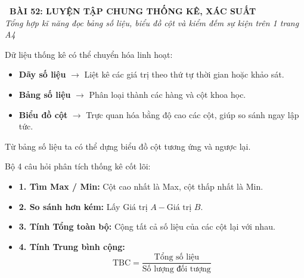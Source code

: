 \documentclass[14pt,a4paper,oneside]{extbook}
\begin{document}
\noindent
\begin{tcolorbox}[
  enhanced,
  colback=teal!8!white,
  colframe=teal!80!black,
  arc=3mm, boxrule=1pt,
  left=3mm, right=3mm, top=2mm, bottom=2mm,
  halign=center
]
  {\Large\bfseries\color{teal!90!black}\faBookmark\ BÀI 52: LUYỆN TẬP CHUNG THỐNG KÊ, XÁC SUẤT}\\[1.5pt]
  {\footnotesize\itshape\color{black!75} Tổng hợp kĩ năng đọc bảng số liệu, biểu đồ cột và kiểm đếm sự kiện trên 1 trang A4}
\end{tcolorbox}

\vspace{-2.5mm}

\noindent
\begin{minipage}[t]{0.49\textwidth}\vspace{0pt}
\begin{tcolorbox}[
  enhanced,
  colback=blue!4!white,
  colframe=blue!75!black,
  arc=2mm, boxrule=0.8pt,
  left=2mm, right=2mm, top=1.8mm, bottom=1.8mm,
  title={\footnotesize\bfseries\color{white}\faExchange\ 1. Chuyển đổi dữ liệu đa chiều}
]
{\footnotesize
Dữ liệu thống kê có thể chuyển hóa linh hoạt:
\begin{itemize}\setlength{\itemsep}{1pt}\setlength{\leftskip}{-2.5mm}
  \item \textbf{Dãy số liệu} $\to$ Liệt kê các giá trị theo thứ tự thời gian hoặc khảo sát.
  \item \textbf{Bảng số liệu} $\to$ Phân loại thành các hàng và cột khoa học.
  \item \textbf{Biểu đồ cột} $\to$ Trực quan hóa bằng độ cao các cột, giúp so sánh ngay lập tức.
\end{itemize}
Từ bảng số liệu ta có thể dựng biểu đồ cột tương ứng và ngược lại.
}
\end{tcolorbox}
\end{minipage}
\hfill
\begin{minipage}[t]{0.49\textwidth}\vspace{0pt}
\begin{tcolorbox}[
  enhanced,
  colback=teal!4!white,
  colframe=teal!75!black,
  arc=2mm, boxrule=0.8pt,
  left=2mm, right=2mm, top=1.8mm, bottom=1.8mm,
  title={\footnotesize\bfseries\color{white}\faCalculator\ 2. Phương pháp phân tích câu hỏi}
]
{\footnotesize
Bộ 4 câu hỏi phân tích thống kê cốt lõi:
\begin{itemize}\setlength{\itemsep}{1pt}\setlength{\leftskip}{-2.5mm}
  \item \textbf{1. Tìm Max / Min:} Cột cao nhất là Max, cột thấp nhất là Min.
  \item \textbf{2. So sánh hơn kém:} Lấy $\text{Giá trị } A - \text{Giá trị } B$.
  \item \textbf{3. Tính Tổng toàn bộ:} Cộng tất cả số liệu của các cột lại với nhau.
  \item \textbf{4. Tính Trung bình cộng:}
  $$\text{TBC} = \dfrac{\text{Tổng số liệu}}{\text{Số lượng đối tượng}}$$
\end{itemize}
}
\end{tcolorbox}
\end{minipage}
\end{document}
